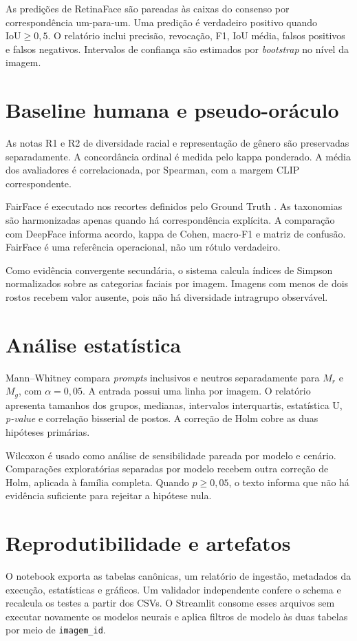 As predições de RetinaFace são pareadas às caixas do consenso por correspondência um-para-um. Uma predição é verdadeiro positivo quando $\mathrm{IoU} \geq 0,5$. O relatório inclui precisão, revocação, F1, IoU média, falsos positivos e falsos negativos. Intervalos de confiança são estimados por \textit{bootstrap} no nível da imagem.

\section{Baseline humana e pseudo-oráculo}

As notas R1 e R2 de diversidade racial e representação de gênero são preservadas separadamente. A concordância ordinal é medida pelo kappa ponderado. A média dos avaliadores é correlacionada, por Spearman, com a margem CLIP correspondente.

FairFace é executado nos recortes definidos pelo Ground Truth \cite{karkkainen2021fairface}. As taxonomias são harmonizadas apenas quando há correspondência explícita. A comparação com DeepFace informa acordo, kappa de Cohen, macro-F1 e matriz de confusão. FairFace é uma referência operacional, não um rótulo verdadeiro.

Como evidência convergente secundária, o sistema calcula índices de Simpson normalizados sobre as categorias faciais por imagem. Imagens com menos de dois rostos recebem valor ausente, pois não há diversidade intragrupo observável.

\section{Análise estatística}

Mann--Whitney compara \textit{prompts} inclusivos e neutros separadamente para $M_r$ e $M_g$, com $\alpha = 0,05$. A entrada possui uma linha por imagem. O relatório apresenta tamanhos dos grupos, medianas, intervalos interquartis, estatística U, \textit{p-value} e correlação bisserial de postos. A correção de Holm cobre as duas hipóteses primárias.

Wilcoxon é usado como análise de sensibilidade pareada por modelo e cenário. Comparações exploratórias separadas por modelo recebem outra correção de Holm, aplicada à família completa. Quando $p \geq 0,05$, o texto informa que não há evidência suficiente para rejeitar a hipótese nula.

\section{Reprodutibilidade e artefatos}

O notebook exporta as tabelas canônicas, um relatório de ingestão, metadados da execução, estatísticas e gráficos. Um validador independente confere o schema e recalcula os testes a partir dos CSVs. O Streamlit consome esses arquivos sem executar novamente os modelos neurais e aplica filtros de modelo às duas tabelas por meio de \texttt{imagem\_id}.
